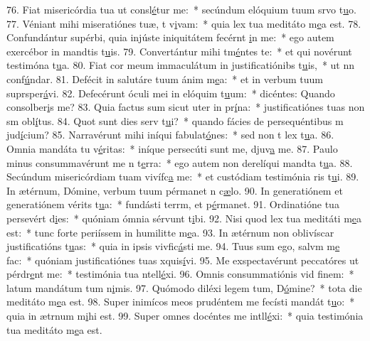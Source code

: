 76. Fiat misericórdia tua ut consl\uline{é}tur me:~* secúndum elóquium tuum srvo t\uline{u}o.
77. Véniant mihi miseratiónes tuæ, t v\uline{i}vam:~* quia lex tua meditáto m\uline{e}a est.
78. Confundántur supérbi, quia injúste iniquitátem fecérnt \uline{i}n me:~* ego autem exercébor in mandtis t\uline{u}is.
79. Convertántur mihi tm\uline{é}ntes te:~* et qui novérunt testimóna t\uline{u}a.
80. Fiat cor meum immaculátum in justificatiónibs t\uline{u}is,~* ut nn conf\uline{ú}ndar.
81. Defécit in salutáre tuum ánim m\uline{e}a:~* et in verbum tuum suprsper\uline{á}vi.
82. Defecérunt óculi mei in elóquim t\uline{u}um:~* dicéntes: Quando consolber\uline{i}s me?
83. Quia factus sum sicut uter in pr\uline{í}na:~* justificatiónes tuas non sm obl\uline{í}tus.
84. Quot sunt dies serv t\uline{u}i?~* quando fácies de persequéntibus m jud\uline{í}cium?
85. Narravérunt mihi iníqui fabulat\uline{ó}nes:~* sed non t lex t\uline{u}a.
86. Omnia mandáta tu v\uline{é}ritas:~* iníque persecúti sunt me, djuv\uline{a} me.
87. Paulo minus consummavérunt me n t\uline{e}rra:~* ego autem non derelíqui mandta t\uline{u}a.
88. Secúndum misericórdiam tuam vivífc\uline{a} me:~* et custódiam testimónia ris t\uline{u}i.
89. In ætérnum, Dómine, verbum tuum pérmanet n c\uline{æ}lo.
90. In generatiónem et generatiónem vérits t\uline{u}a:~* fundásti terrm, et p\uline{é}rmanet.
91. Ordinatióne tua persevért d\uline{i}es:~* quóniam ómnia sérvunt t\uline{i}bi.
92. Nisi quod lex tua meditáti m\uline{e}a est:~* tunc forte periíssem in humilitte m\uline{e}a.
93. In ætérnum non oblivíscar justificatións t\uline{u}as:~* quia in ipsis vivfic\uline{á}sti me.
94. Tuus sum ego, salvm m\uline{e} fac:~* quóniam justificatiónes tuas xquis\uline{í}vi.
95. Me exspectavérunt peccatóres ut pérdr\uline{e}nt me:~* testimónia tua ntell\uline{é}xi.
96. Omnis consummatiónis vid f\uline{i}nem:~* latum mandátum tum n\uline{i}mis.
97. Quómodo diléxi legem tum, D\uline{ó}mine?~* tota die meditáto m\uline{e}a est.
98. Super inimícos meos prudéntem me fecísti mandát t\uline{u}o:~* quia in ætrnum m\uline{i}hi est.
99. Super omnes docéntes me intll\uline{é}xi:~* quia testimónia tua meditáto m\uline{e}a est.
